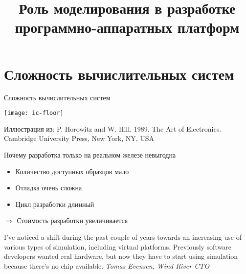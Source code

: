 

\title{Роль моделирования в разработке программно-аппаратных платформ}




\begin{frame}
    \maketitle
\end{frame}

\begin{frame}
    \tableofcontents
\end{frame}

\section{Сложность вычислительных систем}

\begin{frame}{Сложность вычислительных систем}

\centering
\texttt{[image: ic-floor]}

\tiny{Иллюстрация из: P. Horowitz and W. Hill. 1989. The Art of Electronics. Cambridge University Press, New York, NY, USA}

\end{frame}

\begin{frame}{Почему разработка только на реальном железе невыгодна }

\begin{itemize}
\item Количество доступных образцов мало
\item Отладка очень сложна
\item Цикл разработки длинный
\end{itemize}

$\Rightarrow$ Стоимость разработки увеличивается

\bigskip

\tiny{I've noticed a shift during the past couple of years towards an increasing use of various types of simulation, including virtual platforms. Previously software developers wanted real hardware, but now they have to start using simulation because there's no chip available. \textit{Tomas Evensen, Wind River CTO}}

\end{frame}

